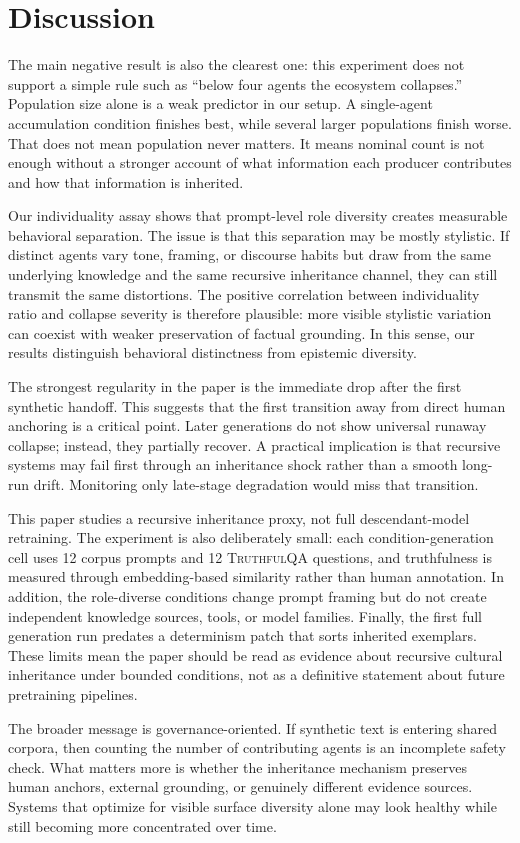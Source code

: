 \section{Discussion}
\label{sec:discussion}

The main negative result is also the clearest one: this experiment does not support a simple rule such as ``below four agents the ecosystem collapses.'' Population size alone is a weak predictor in our setup. A single-agent accumulation condition finishes best, while several larger populations finish worse. That does not mean population never matters. It means nominal count is not enough without a stronger account of what information each producer contributes and how that information is inherited.

Our individuality assay shows that prompt-level role diversity creates measurable behavioral separation. The issue is that this separation may be mostly stylistic. If distinct agents vary tone, framing, or discourse habits but draw from the same underlying knowledge and the same recursive inheritance channel, they can still transmit the same distortions. The positive correlation between individuality ratio and collapse severity is therefore plausible: more visible stylistic variation can coexist with weaker preservation of factual grounding. In this sense, our results distinguish behavioral distinctness from epistemic diversity.

The strongest regularity in the paper is the immediate drop after the first synthetic handoff. This suggests that the first transition away from direct human anchoring is a critical point. Later generations do not show universal runaway collapse; instead, they partially recover. A practical implication is that recursive systems may fail first through an inheritance shock rather than a smooth long-run drift. Monitoring only late-stage degradation would miss that transition.

This paper studies a recursive inheritance proxy, not full descendant-model retraining. The experiment is also deliberately small: each condition-generation cell uses 12 corpus prompts and 12 \textsc{TruthfulQA} questions, and truthfulness is measured through embedding-based similarity rather than human annotation. In addition, the role-diverse conditions change prompt framing but do not create independent knowledge sources, tools, or model families. Finally, the first full generation run predates a determinism patch that sorts inherited exemplars. These limits mean the paper should be read as evidence about recursive cultural inheritance under bounded conditions, not as a definitive statement about future pretraining pipelines.

The broader message is governance-oriented. If synthetic text is entering shared corpora, then counting the number of contributing agents is an incomplete safety check. What matters more is whether the inheritance mechanism preserves human anchors, external grounding, or genuinely different evidence sources. Systems that optimize for visible surface diversity alone may look healthy while still becoming more concentrated over time.
